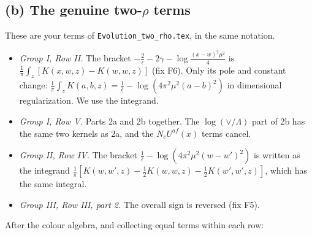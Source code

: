 \documentclass[10pt]{article}
\numberwithin{equation}{section}
\begin{document}
\subsection{(b) The genuine two-\texorpdfstring{$\rho$}{rho} terms}
These are your terms of \texttt{Evolution\_two\_rho.tex}, in the same notation.
\begin{itemize}
\item \emph{Group I, Row II.} The bracket $-\frac2\epsilon-2\gamma-\log\frac{(x-w)^2\mu^2}{4}$ is $\frac1\pi\int_z[K(x,w,z)-K(w,w,z)]$ (fix F6). Only its pole and constant change: $\frac1\pi\int_zK(a,b,z)=\frac1{\bar\epsilon}-\log(4\pi^2\mu^2(a-b)^2)$ in dimensional regularization. We use the integrand.
\item \emph{Group I, Row V.} Parts 2a and 2b together. The $\log(\vee/\Lambda)$ part of 2b has the same two kernels as 2a, and the $N_cU^{af}(x)$ terms cancel.
\item \emph{Group II, Row IV.} The bracket $\frac1{\bar\epsilon}-\log(4\pi^2\mu^2(w-w')^2)$ is written as the integrand $\frac1\pi[K(w,w',z)-\frac12K(w,w,z)-\frac12K(w',w',z)]$, which has the same integral.
\item \emph{Group III, Row III, part 2.} The overall sign is reversed (fix F5).
\end{itemize}
After the colour algebra, and collecting equal terms within each row:
\end{document}
